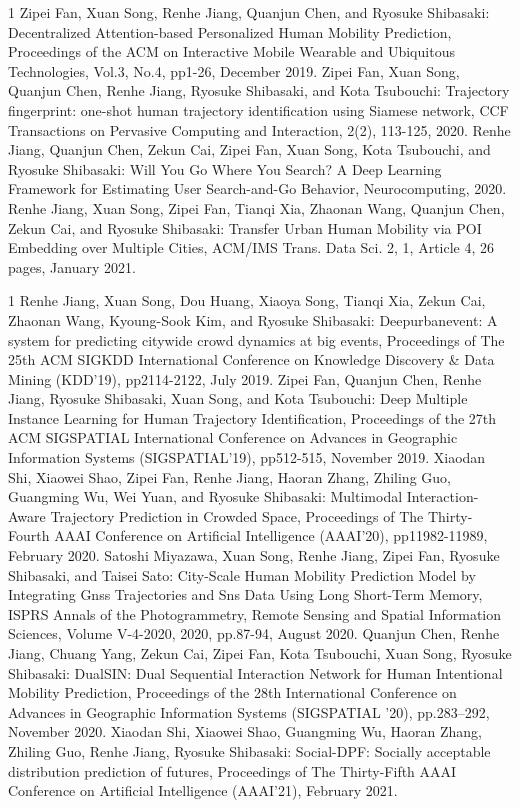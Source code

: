 \begin{雑誌論文}{1}
Zipei Fan, Xuan Song, Renhe Jiang, Quanjun Chen, and Ryosuke Shibasaki:
Decentralized Attention-based Personalized Human Mobility Prediction, Proceedings of the ACM on Interactive Mobile Wearable and Ubiquitous Technologies, Vol.3, No.4, pp1-26, December 2019.
Zipei Fan, Xuan Song, Quanjun Chen, Renhe Jiang, Ryosuke Shibasaki, and Kota Tsubouchi:  
Trajectory fingerprint: one-shot human trajectory identification using Siamese network, CCF Transactions on Pervasive Computing and Interaction, 2(2), 113-125, 2020.
Renhe Jiang, Quanjun Chen, Zekun Cai, Zipei Fan, Xuan Song, Kota Tsubouchi, and Ryosuke Shibasaki: 
Will You Go Where You Search? A Deep Learning Framework for Estimating User Search-and-Go Behavior, Neurocomputing, 2020.
Renhe Jiang, Xuan Song, Zipei Fan, Tianqi Xia, Zhaonan Wang, Quanjun Chen, Zekun Cai, and Ryosuke Shibasaki: 
Transfer Urban Human Mobility via POI Embedding over Multiple Cities, ACM/IMS Trans. Data Sci. 2, 1, Article 4, 26 pages, January 2021.
\end{雑誌論文}

\begin{査読付}{1}
Renhe Jiang, Xuan Song, Dou Huang, Xiaoya Song, Tianqi Xia, Zekun Cai, Zhaonan Wang, Kyoung-Sook Kim, and Ryosuke Shibasaki:
Deepurbanevent: A system for predicting citywide crowd dynamics at big events, Proceedings of The 25th ACM SIGKDD International Conference on Knowledge Discovery \& Data Mining (KDD'19), pp2114-2122, July 2019.
Zipei Fan, Quanjun Chen, Renhe Jiang, Ryosuke Shibasaki, Xuan Song, and Kota Tsubouchi:
Deep Multiple Instance Learning for Human Trajectory Identification, Proceedings of the 27th ACM SIGSPATIAL International Conference on Advances in Geographic Information Systems (SIGSPATIAL'19), pp512-515, November 2019.
Xiaodan Shi, Xiaowei Shao, Zipei Fan, Renhe Jiang, Haoran Zhang, Zhiling Guo, Guangming Wu, Wei Yuan, and Ryosuke Shibasaki:
Multimodal Interaction-Aware Trajectory Prediction in Crowded Space, Proceedings of The Thirty-Fourth AAAI Conference on Artificial Intelligence (AAAI'20), pp11982-11989, February 2020.
Satoshi Miyazawa, Xuan Song, Renhe Jiang, Zipei Fan, Ryosuke Shibasaki, and Taisei Sato:
City-Scale Human Mobility Prediction Model by Integrating Gnss Trajectories and Sns Data Using Long Short-Term Memory, ISPRS Annals of the Photogrammetry, Remote Sensing and Spatial Information Sciences, Volume V-4-2020, 2020, pp.87-94, August 2020.
Quanjun Chen, Renhe Jiang, Chuang Yang, Zekun Cai, Zipei Fan, Kota Tsubouchi, Xuan Song, Ryosuke Shibasaki: 
DualSIN: Dual Sequential Interaction Network for Human Intentional Mobility Prediction, Proceedings of the 28th International Conference on Advances in Geographic Information Systems (SIGSPATIAL '20), pp.283–292, November 2020.
Xiaodan Shi, Xiaowei Shao, Guangming Wu, Haoran Zhang, Zhiling Guo, Renhe Jiang, Ryosuke Shibasaki: 
Social-DPF: Socially acceptable distribution prediction of futures, Proceedings of The Thirty-Fifth AAAI Conference on Artificial Intelligence (AAAI'21), February 2021.
\end{査読付}


